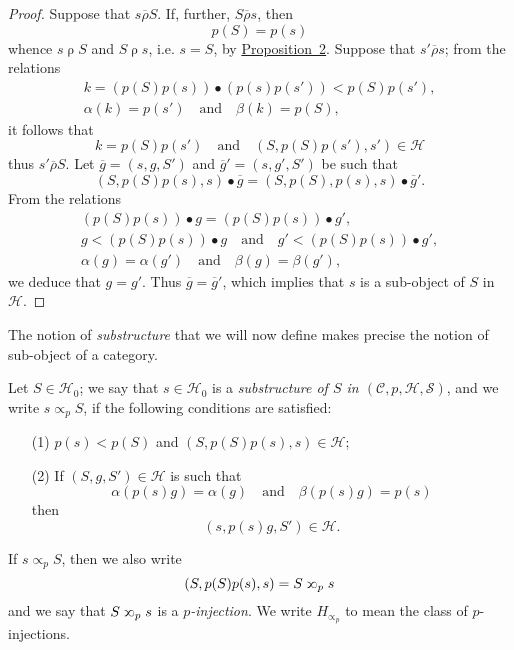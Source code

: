 \documentclass[a4paper,fleqn]{article}
\theoremstyle{plain}
\theoremstyle{definition}
\newenvironment{definition}[1]
  {\renewcommand\theinnerdefinition{#1}\innerdefinition}
  {\endinnerdefinition}
\newcommand{\oldpage}[1]{{\marginpar{\footnotesize$\bigg\vert$\,\,\,\,\textit{p.~#1}}}}
\newcommand{\textand}{\quad\text{and}\quad}
\newcommand{\CC}{\mathcal{C}}
\newcommand{\HH}{\mathcal{H}}
\renewcommand{\SS}{\mathcal{S}}
\newcommand{\relrho}{\mathrel{\rho}}
\newcommand{\relrhobar}{\mathrel{\overline{\rho}}}
\newcommand{\subs}{\mathrel{\propto}}
\newcommand{\sups}{\mathrel{\reflectbox{$\propto$}}}
\begin{document}
\begin{proof}
  Suppose that $s\relrhobar S$.
  If, further, $S\relrhobar s$, then
  \[
    p(S)=p(s)
  \]
  whence $s\relrho S$ and $S\relrho s$, i.e. $s=S$, by \hyperref[Proposition~2]{Proposition~2}.
  Suppose that $s'\relrhobar s$;
  from the relations
  \[
    \begin{gathered}
      k = (p(S)p(s))\bullet(p(s)p(s'))
      < p(S)p(s'),
    \\\alpha(k)=p(s')
      \textand
      \beta(k)=p(S),
    \end{gathered}
  \]
  it follows that
  \[
    k=p(S)p(s')
    \textand
    (S,p(S)p(s'),s')\in\HH
  \]
  thus $s'\relrhobar S$.
  \oldpage{360}
  Let $\overline{g}=(s,g,S')$ and $\overline{g}'=(s,g',S')$ be such that
  \[
    (S,p(S)p(s),s)\bullet\overline{g}
    = (S,p(S),p(s),s)\bullet\overline{g}'.
  \]
  From the relations
  \[
    \begin{gathered}
      (p(S)p(s))\bullet g = (p(S)p(s))\bullet g',
    \\g < (p(S)p(s))\bullet g
      \textand
      g' < (p(S)p(s))\bullet g',
    \\\alpha(g)=\alpha(g')
      \textand
      \beta(g)=\beta(g'),
    \end{gathered}
  \]
  we deduce that $g=g'$.
  Thus $\overline{g}=\overline{g}'$, which implies that $s$ is a sub-object of $S$ in $\HH$.
\end{proof}

The notion of \emph{substructure} that we will now define makes precise the notion of sub-object of a category.

\begin{definition}{7}
\label{definition:i-7}
  Let $S\in\HH_0$;
  we say that $s\in\HH_0$ is a \emph{substructure of $S$ in $(\CC,p,\HH,\SS)$}, and we write $s\subs_p S$, if the following conditions are satisfied:
  \begin{enumerate}
    \item[\normalfont(1)]
      $p(s)<p(S)$ and $(S,p(S)p(s),s)\in\HH$;
    \item[\normalfont(2)]
      If $(S,g,S')\in\HH$ is such that
      \[
        \alpha(p(s)g)=\alpha(g)
        \textand
        \beta(p(s)g)=p(s)
      \]
      then
      \[
        (s,p(s)g,S')\in\HH.
      \]
  \end{enumerate}
  If $s\subs_pS$, then we also write
  \[
    (S,p(S)p(s),s)
    = S\sups_p s
  \]
  and we say that $S\sups_p s$ is a \emph{$p$-injection}.
  We write $H_{\subs_p}$ to mean the class of $p$-injections.
\end{definition}
\end{document}
